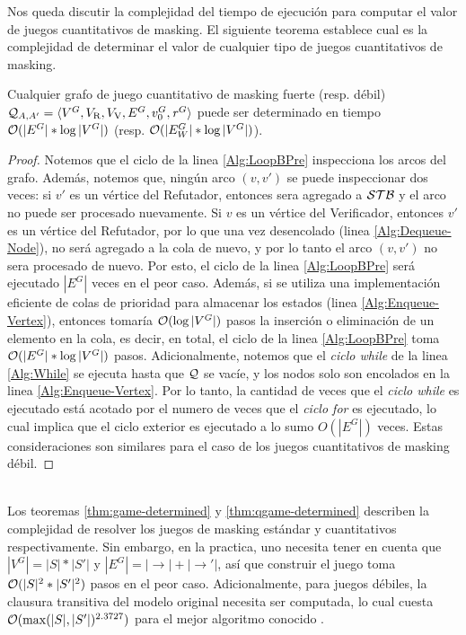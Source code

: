 Nos queda discutir la complejidad del tiempo de ejecución para computar el valor de juegos cuantitativos de masking. 
El siguiente teorema establece cual es la complejidad de determinar el valor de cualquier tipo de juegos cuantitativos de masking.
%
\sloppy \begin{theorem}\label{thm:qgame-determined} Cualquier grafo de juego cuantitativo de masking fuerte (resp. débil) 
$\mathcal{Q}_{A, A'} = \langle V^G, V_{\mathrm{R}}, V_{\mathrm{V}}, E^G, v_0^G, \mathit{r}^G \rangle$ puede ser determinado en tiempo $\mathcal{O}(|E^G|*\log |V^G|)$ (resp. $\mathcal{O}(|E_W^G|*\log |V^G|)$).
\end{theorem}
\begin{proof}
	Notemos que el ciclo de la linea \ref{Alg:LoopBPre} inspecciona los arcos del grafo. Además, notemos que, ningún arco $(v, v')$ se puede inspeccionar dos veces:
	si $v'$ es un vértice del Refutador, entonces sera agregado a $\mathcal{STB}$ y el arco no puede ser procesado nuevamente. 
	Si $v$ es un vértice del Verificador, entonces $v'$ es un vértice del Refutador, por lo que una vez desencolado (linea \ref{Alg:Dequeue-Node}), no será agregado a la cola de nuevo, y por lo tanto el arco $(v, v')$ no sera procesado de nuevo. Por esto, el ciclo de la linea \ref{Alg:LoopBPre} será ejecutado $|E^G|$ veces en el peor caso. 
	Además, si se utiliza una implementación eficiente de colas de prioridad para almacenar los estados (linea \ref{Alg:Enqueue-Vertex}), 
	entonces tomaría $\mathcal{O}(\log |V^G|)$ pasos la inserción o eliminación de un elemento en la cola, es decir, en total, el ciclo de la linea \ref{Alg:LoopBPre} toma $\mathcal{O}(|E^G|*\log |V^G|)$ pasos.
	Adicionalmente, notemos que el \emph{ciclo while} de la linea \ref{Alg:While} se ejecuta hasta que $\mathcal{Q}$ se vacíe, y los nodos solo son encolados en la linea \ref{Alg:Enqueue-Vertex}. Por lo tanto, la cantidad de veces que el \emph{ciclo while} es ejecutado está acotado por el numero de veces que el \emph{ciclo for} 	es ejecutado, lo cual implica que el ciclo exterior es ejecutado a lo sumo $O(|E^G|)$ veces. Estas consideraciones son similares para el caso de los juegos cuantitativos de masking débil.	

\qedhere
\end{proof} \\

Los teoremas \ref{thm:game-determined} y \ref{thm:qgame-determined} describen la complejidad de resolver los juegos de masking estándar y cuantitativos respectivamente. Sin embargo, en la practica, uno necesita tener en cuenta que $|V^G| = |S|*|S'|$ y $|E^G| = |{\rightarrow}|+|{\rightarrow'}|$, así que construir el juego toma 
$\mathcal{O}(|S|^2*|S'|^2)$ pasos en el peor caso. Adicionalmente, para juegos débiles, la clausura transitiva del modelo original necesita ser computada, lo cual cuesta $\mathcal{O}(\max(|S|,|S'|)^{2.3727})$ para el mejor algoritmo conocido \cite{Wil12}.

